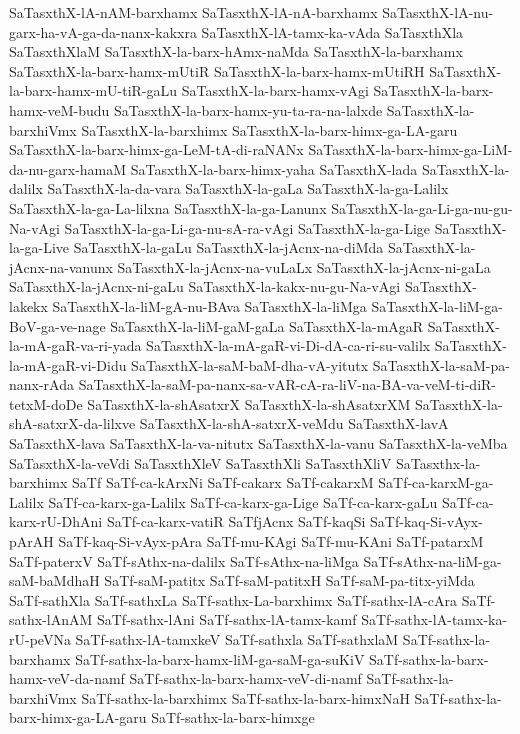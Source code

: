 {SaTasxthX-lA-nAM-barxhamx
SaTasxthX-lA-nA-barxhamx
SaTasxthX-lA-nu-garx-ha-vA-ga-da-nanx-kakxra
SaTasxthX-lA-tamx-ka-vAda
SaTasxthXla
SaTasxthXlaM
SaTasxthX-la-barx-hAmx-naMda
SaTasxthX-la-barxhamx
SaTasxthX-la-barx-hamx-mUtiR
SaTasxthX-la-barx-hamx-mUtiRH
SaTasxthX-la-barx-hamx-mU-tiR-gaLu
SaTasxthX-la-barx-hamx-vAgi
SaTasxthX-la-barx-hamx-veM-budu
SaTasxthX-la-barx-hamx-yu-ta-ra-na-lalxde
SaTasxthX-la-barxhiVmx
SaTasxthX-la-barxhimx
SaTasxthX-la-barx-himx-ga-LA-garu
SaTasxthX-la-barx-himx-ga-LeM-tA-di-raNANx
SaTasxthX-la-barx-himx-ga-LiM-da-nu-garx-hamaM
SaTasxthX-la-barx-himx-yaha
SaTasxthX-lada
SaTasxthX-la-dalilx
SaTasxthX-la-da-vara
SaTasxthX-la-gaLa
SaTasxthX-la-ga-Lalilx
SaTasxthX-la-ga-La-lilxna
SaTasxthX-la-ga-Lanunx
SaTasxthX-la-ga-Li-ga-nu-gu-Na-vAgi
SaTasxthX-la-ga-Li-ga-nu-sA-ra-vAgi
SaTasxthX-la-ga-Lige
SaTasxthX-la-ga-Live
SaTasxthX-la-gaLu
SaTasxthX-la-jAcnx-na-diMda
SaTasxthX-la-jAcnx-na-vanunx
SaTasxthX-la-jAcnx-na-vuLaLx
SaTasxthX-la-jAcnx-ni-gaLa
SaTasxthX-la-jAcnx-ni-gaLu
SaTasxthX-la-kakx-nu-gu-Na-vAgi
SaTasxthX-lakekx
SaTasxthX-la-liM-gA-nu-BAva
SaTasxthX-la-liMga
SaTasxthX-la-liM-ga-BoV-ga-ve-nage
SaTasxthX-la-liM-gaM-gaLa
SaTasxthX-la-mAgaR
SaTasxthX-la-mA-gaR-va-ri-yada
SaTasxthX-la-mA-gaR-vi-Di-dA-ca-ri-su-valilx
SaTasxthX-la-mA-gaR-vi-Didu
SaTasxthX-la-saM-baM-dha-vA-yitutx
SaTasxthX-la-saM-pa-nanx-rAda
SaTasxthX-la-saM-pa-nanx-sa-vAR-cA-ra-liV-na-BA-va-veM-ti-diR-tetxM-doDe
SaTasxthX-la-shAsatxrX
SaTasxthX-la-shAsatxrXM
SaTasxthX-la-shA-satxrX-da-lilxve
SaTasxthX-la-shA-satxrX-veMdu
SaTasxthX-lavA
SaTasxthX-lava
SaTasxthX-la-va-nitutx
SaTasxthX-la-vanu
SaTasxthX-la-veMba
SaTasxthX-la-veVdi
SaTasxthXleV
SaTasxthXli
SaTasxthXliV
SaTasxthx-la-barxhimx
SaTf
SaTf-ca-kArxNi
SaTf-cakarx
SaTf-cakarxM
SaTf-ca-karxM-ga-Lalilx
SaTf-ca-karx-ga-Lalilx
SaTf-ca-karx-ga-Lige
SaTf-ca-karx-gaLu
SaTf-ca-karx-rU-DhAni
SaTf-ca-karx-vatiR
SaTfjAcnx
SaTf-kaqSi
SaTf-kaq-Si-vAyx-pArAH
SaTf-kaq-Si-vAyx-pAra
SaTf-mu-KAgi
SaTf-mu-KAni
SaTf-patarxM
SaTf-paterxV
SaTf-sAthx-na-dalilx
SaTf-sAthx-na-liMga
SaTf-sAthx-na-liM-ga-saM-baMdhaH
SaTf-saM-patitx
SaTf-saM-patitxH
SaTf-saM-pa-titx-yiMda
SaTf-sathXla
SaTf-sathxLa
SaTf-sathx-La-barxhimx
SaTf-sathx-lA-cAra
SaTf-sathx-lAnAM
SaTf-sathx-lAni
SaTf-sathx-lA-tamx-kamf
SaTf-sathx-lA-tamx-ka-rU-peVNa
SaTf-sathx-lA-tamxkeV
SaTf-sathxla
SaTf-sathxlaM
SaTf-sathx-la-barxhamx
SaTf-sathx-la-barx-hamx-liM-ga-saM-ga-suKiV
SaTf-sathx-la-barx-hamx-veV-da-namf
SaTf-sathx-la-barx-hamx-veV-di-namf
SaTf-sathx-la-barxhiVmx
SaTf-sathx-la-barxhimx
SaTf-sathx-la-barx-himxNaH
SaTf-sathx-la-barx-himx-ga-LA-garu
SaTf-sathx-la-barx-himxge
}
